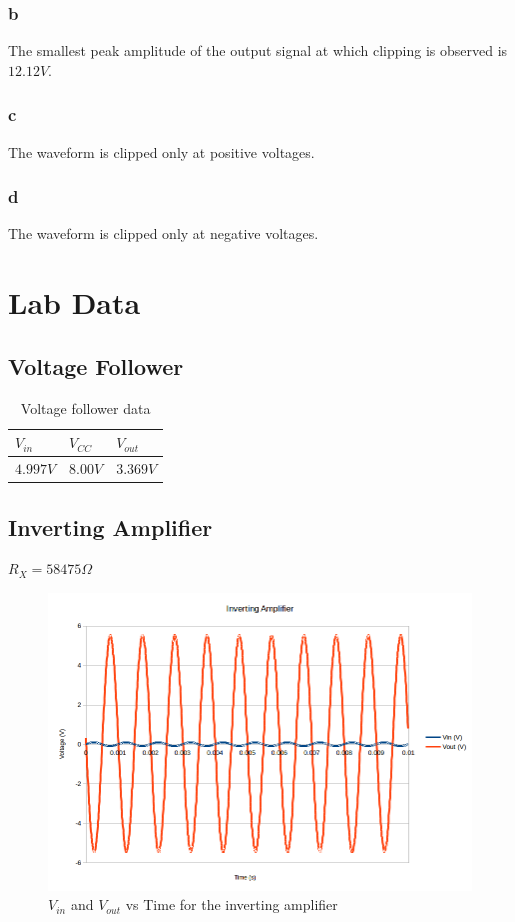 \documentclass[10pt]{article}
\begin{document}
\subsubsection*{b}
{\doublespacing
\noindent The smallest peak amplitude of the output signal at which clipping is observed is $12.12V$.}

\subsubsection*{c}
{\doublespacing
\noindent The waveform is clipped only at positive voltages.}

\subsubsection*{d}
{\doublespacing
\noindent The waveform is clipped only at negative voltages.}

\section*{Lab Data}
\subsection*{Voltage Follower}
\begin{table}[H]
	\centering
	\begin{tabular}{lll}
		\hline
		$V_{in}$ & $V_{CC}$ & $V_{out}$\\
		\hline
		$4.997V$ & $8.00V$ & $3.369V$\\
		\hline
	\end{tabular}
	\caption{Voltage follower data}
\end{table}

\subsection*{Inverting Amplifier}
$R_X = 58475 \Omega$
\begin{figure}[H]
	\centering
	\includegraphics[width=\textwidth]{InvertingAmp.png}
	\caption{$V_{in}$ and $V_{out}$ vs Time for the inverting amplifier}
\end{figure}
\end{document}
